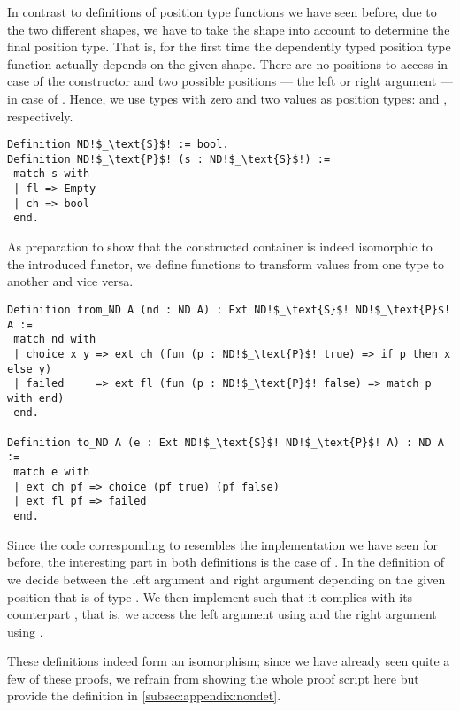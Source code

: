 In contrast to definitions of position type functions we have seen before, due to the two different shapes, we have to take the shape into account to determine the final position type.
That is, for the first time the dependently typed position type function actually depends on the given shape.
There are no positions to access in case of the  constructor and two possible positions --- the left or right argument --- in case of .
Hence, we use types with zero and two values as position types:  and , respectively.

\begin{verbatim}
Definition ND!$_\text{S}$! := bool.
Definition ND!$_\text{P}$! (s : ND!$_\text{S}$!) :=
 match s with
 | fl => Empty
 | ch => bool
 end.
\end{verbatim}

As preparation to show that the constructed container is indeed isomorphic to the introduced functor, we define functions to transform values from one type to another and vice versa.

\begin{verbatim}
Definition from_ND A (nd : ND A) : Ext ND!$_\text{S}$! ND!$_\text{P}$! A :=
 match nd with
 | choice x y => ext ch (fun (p : ND!$_\text{P}$! true) => if p then x else y)
 | failed     => ext fl (fun (p : ND!$_\text{P}$! false) => match p with end)
 end.

Definition to_ND A (e : Ext ND!$_\text{S}$! ND!$_\text{P}$! A) : ND A :=
 match e with
 | ext ch pf => choice (pf true) (pf false)
 | ext fl pf => failed
 end.
\end{verbatim}

Since the code corresponding to  resembles the implementation we have seen for  before, the interesting part in both definitions is the case of .
In the definition of  we decide between the left argument  and right argument  depending on the given position  that is of type .
We then implement  such that it complies with its counterpart , that is, we access the left argument using  and the right argument using .

These definitions indeed form an isomorphism; since we have already seen quite a few of these proofs, we refrain from showing the whole
proof script here but provide the definition in \autoref{subsec:appendix:nondet}.

